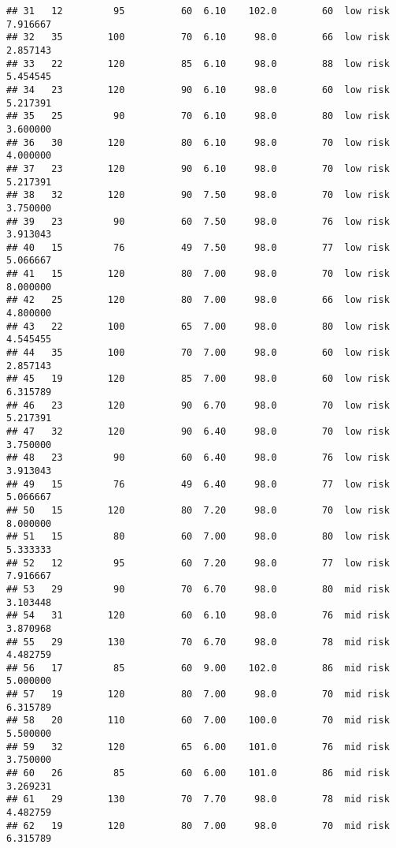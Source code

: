 \documentclass[
  ignorenonframetext,
]{beamer}
\begin{document}
\begin{frame}[fragile]
\begin{verbatim}
## 31   12         95          60  6.10    102.0        60  low risk      7.916667
## 32   35        100          70  6.10     98.0        66  low risk      2.857143
## 33   22        120          85  6.10     98.0        88  low risk      5.454545
## 34   23        120          90  6.10     98.0        60  low risk      5.217391
## 35   25         90          70  6.10     98.0        80  low risk      3.600000
## 36   30        120          80  6.10     98.0        70  low risk      4.000000
## 37   23        120          90  6.10     98.0        70  low risk      5.217391
## 38   32        120          90  7.50     98.0        70  low risk      3.750000
## 39   23         90          60  7.50     98.0        76  low risk      3.913043
## 40   15         76          49  7.50     98.0        77  low risk      5.066667
## 41   15        120          80  7.00     98.0        70  low risk      8.000000
## 42   25        120          80  7.00     98.0        66  low risk      4.800000
## 43   22        100          65  7.00     98.0        80  low risk      4.545455
## 44   35        100          70  7.00     98.0        60  low risk      2.857143
## 45   19        120          85  7.00     98.0        60  low risk      6.315789
## 46   23        120          90  6.70     98.0        70  low risk      5.217391
## 47   32        120          90  6.40     98.0        70  low risk      3.750000
## 48   23         90          60  6.40     98.0        76  low risk      3.913043
## 49   15         76          49  6.40     98.0        77  low risk      5.066667
## 50   15        120          80  7.20     98.0        70  low risk      8.000000
## 51   15         80          60  7.00     98.0        80  low risk      5.333333
## 52   12         95          60  7.20     98.0        77  low risk      7.916667
## 53   29         90          70  6.70     98.0        80  mid risk      3.103448
## 54   31        120          60  6.10     98.0        76  mid risk      3.870968
## 55   29        130          70  6.70     98.0        78  mid risk      4.482759
## 56   17         85          60  9.00    102.0        86  mid risk      5.000000
## 57   19        120          80  7.00     98.0        70  mid risk      6.315789
## 58   20        110          60  7.00    100.0        70  mid risk      5.500000
## 59   32        120          65  6.00    101.0        76  mid risk      3.750000
## 60   26         85          60  6.00    101.0        86  mid risk      3.269231
## 61   29        130          70  7.70     98.0        78  mid risk      4.482759
## 62   19        120          80  7.00     98.0        70  mid risk      6.315789

\end{verbatim}
\end{frame}
\end{document}
